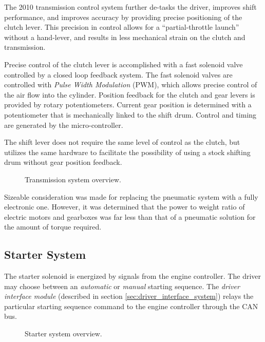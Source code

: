 The 2010 transmission control system further de-tasks the driver, improves shift performance, and improves accuracy by providing precise positioning of the clutch lever. This precision in control allows for a {}``partial-throttle launch'' without a hand-lever, and results in less mechanical strain on the clutch and transmission. 


Precise control of the clutch lever is accomplished with a fast solenoid valve controlled by a closed loop feedback system. The fast solenoid valves are controlled with \emph{Pulse Width Modulation} (PWM), which allows precise control of the air flow into the cylinder. Position feedback for the clutch and gear levers is provided by rotary potentiometers. Current gear position is determined with a potentiometer that is mechanically linked to the shift drum. Control and timing are generated by the micro-controller.

The shift lever does not require the same level of control as the clutch, but utilizes the same hardware to facilitate the possibility of using a stock shifting drum without gear position feedback.

\begin{figure}[H]
	\centering
		
	\caption{Transmission system overview.}
	\label{fig:transmission_system_overview}
\end{figure}

Sizeable consideration was made for replacing the pneumatic system with a fully electronic one. However, it was determined that the power to weight ratio of electric motors and gearboxes was far less than that of a pneumatic solution for the amount of torque required.

\subsection{Starter System}

The starter solenoid is energized by signals from the engine controller. The driver may choose between an \emph{automatic} or \emph{manual} starting sequence. The \emph{driver interface module} (described in section \ref{sec:driver_interface_system}) relays the particular starting sequence command to the engine controller through the CAN bus.

\begin{figure}[H]
	\centering
		
	\caption{Starter system overview.}
	\label{fig:starter_system_overview}
\end{figure}


